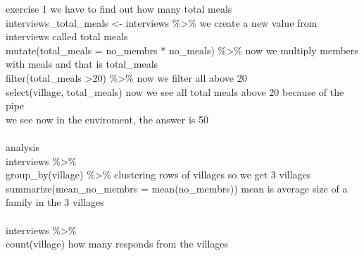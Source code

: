 \documentclass{article}
\begin{document}
 exercise 1 we have to find out how many total meals\\
interviews\_total\_meals \textless- interviews \%\textgreater\%   we create a new value from interviews called total meals\\
  mutate(total\_meals = no\_membrs * no\_meals) \%\textgreater\%   now we multiply members with meals and that is total\_meals \\
  filter(total\_meals \textgreater 20) \%\textgreater\%   now we filter all above 20\\
  select(village, total\_meals)   now we see all total meals above 20 because of the pipe\\
    we see now in the enviroment, the answer is 50\\\\

  analysis\\
interviews \%\textgreater\%\\
  group\_by(village) \%\textgreater\%   clustering rows of villages so we get 3 villages\\
  summarize(mean\_no\_membrs = mean(no\_membrs))   mean is average size of a family in the 3 villages \\\\

interviews \%\textgreater\%\\
  count(village)    how many responds from the villages \\
\end{document}

